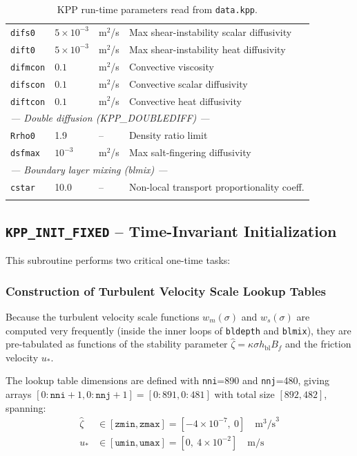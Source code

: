 \documentclass[12pt,letterpaper]{article}
\newcommand{\hbl}{h_{\mathrm{bl}}}
\newcommand{\ustar}{u_*}
\newcommand{\wm}{w_m}
\newcommand{\ws}{w_s}
\begin{document}
\begin{longtable}{lll p{4.5cm}}
\texttt{difs0}    & $5\times10^{-3}$    & m$^2$/s & Max shear-instability scalar diffusivity \\  
\texttt{dift0}    & $5\times10^{-3}$    & m$^2$/s & Max shear-instability heat diffusivity \\  
\texttt{difmcon}  & $0.1$               & m$^2$/s & Convective viscosity \\  
\texttt{difscon}  & $0.1$               & m$^2$/s & Convective scalar diffusivity \\  
\texttt{diftcon}  & $0.1$               & m$^2$/s & Convective heat diffusivity \\  
\midrule  
\multicolumn{4}{l}{\textit{--- Double diffusion (KPP\_DOUBLEDIFF) ---}} \\  
\texttt{Rrho0}   & 1.9                  & -- & Density ratio limit \\  
\texttt{dsfmax}  & $10^{-3}$           & m$^2$/s & Max salt-fingering diffusivity \\  
\midrule  
\multicolumn{4}{l}{\textit{--- Boundary layer mixing (blmix) ---}} \\  
\texttt{cstar}  & 10.0 & -- & Non-local transport proportionality coeff. \\  
\bottomrule  
\caption{KPP run-time parameters read from \texttt{data.kpp}.}  
\label{tab:params}  
\end{longtable}  
  
\subsection{\texttt{KPP\_INIT\_FIXED} -- Time-Invariant Initialization}  
  
This subroutine performs two critical one-time tasks:  
  
\subsubsection{Construction of Turbulent Velocity Scale Lookup Tables}  
  
Because the turbulent velocity scale functions $\wm(\sigma)$ and  
$\ws(\sigma)$ are computed very frequently (inside the inner loops of  
\texttt{bldepth} and \texttt{blmix}), they are pre-tabulated as  
functions of the stability parameter $\hat{\zeta} = \kappa \sigma  
\hbl B_f$ and the friction velocity $\ustar$.  
  
The lookup table dimensions are defined with \texttt{nni}=890 and \texttt{nnj}=480,
giving arrays $[0:\texttt{nni}+1, 0:\texttt{nnj}+1] = [0:891, 0:481]$
with total size $[892, 482]$, spanning:  
\begin{align}  
\hat{\zeta} &\in [\texttt{zmin}, \texttt{zmax}] = [-4\times10^{-7},\ 0]  
\quad \text{m}^3\text{/s}^3 \\  
\ustar &\in [\texttt{umin}, \texttt{umax}] = [0,\ 4\times10^{-2}]  
\quad \text{m/s}  
\end{align}  
  
\end{document}
